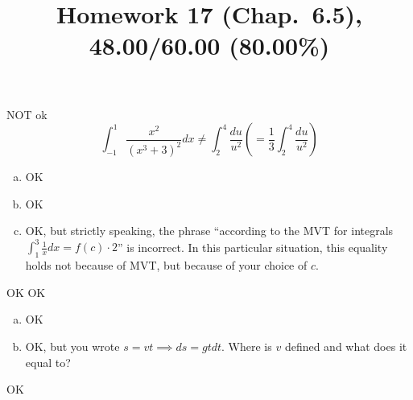 \documentclass[10pt]{article} %
\title{Homework 17 (Chap.~6.5),
48.00/60.00 (80.00\%)
}
\begin{document}
\maketitle
{}
NOT ok
\begin{equation*}
	\int_{-1}^1\frac{x^2}{(x^3+3)^2}dx\neq \int_{2}^4\frac{du}{u^2}\left( =\frac{1}{3}\int_2^4\frac{du}{u^2} 
	\right)
\end{equation*}
\begin{enumerate}[(a)]
	\item OK
	\item OK
	\item OK, but strictly speaking, the phrase ``according to the MVT for integrals $\int_{1}^3\frac{1}{x}dx=
		f(c)\cdot2$'' is incorrect. In this particular situation, this equality holds not because of
		MVT, but because of your choice of $c$.
\end{enumerate}
OK
OK
\begin{enumerate}[(a)]
	\item OK
	\item OK, but you wrote $s=vt\implies ds=gt dt$. Where is $v$ defined
		and what does it equal to?
\end{enumerate}
OK
\end{document}
